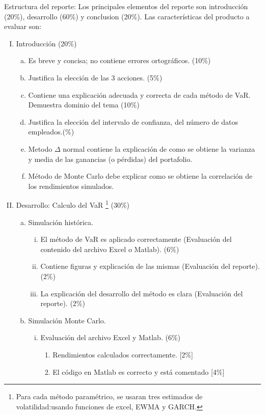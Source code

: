 \documentclass[12pt]{article}
\begin{document}
Estructura del reporte: Los principales elementos del reporte son introducci\'on (20\%), desarrollo (60\%) y conclusion (20\%).
Las caracter\'isticas del producto a evaluar son:
\begin{enumerate}[I.]
	\item Introducci\'on (20\%)
\begin{enumerate}[a)]
	\item Es breve y concisa; no contiene errores ortogr\'aficos. (10\%)
	\item Justifica la elecci\'on de las 3 acciones. (5\%)
	\item Contiene una explicaci\'on adecuada y correcta de cada m\'etodo de VaR. Demuestra dominio del tema (10\%)
	\item Justifica la elecci\'on del intervalo de confianza, del número de datos empleados.(\%)
    \item Metodo $\Delta$ normal contiene la explicaci\'on de como se obtiene la varianza y media de las ganancias (o p\'erdidas) del portafolio.
    \item M\'etodo de Monte Carlo debe explicar como se obtiene la correlaci\'on de los rendimientos simulados.
\end{enumerate}
	\item Desarrollo: Calculo del VaR \footnote{Para cada m\'etodo param\'etrico, se usaran tres estimados de volatilidad:usando funciones de excel, EWMA y GARCH.} (30\%)
\begin{enumerate}[a)]
	\item Simulaci\'on hist\'orica.
\begin{enumerate}[i)]
	\item El m\'etodo de VaR es aplicado correctamente (Evaluaci\'on del contenido del archivo Excel o Matlab). (6\%)
	\item Contiene figuras y explicaci\'on de las mismas (Evaluaci\'on del reporte). (2\%)
	\item La explicaci\'on del desarrollo del m\'etodo es clara (Evaluaci\'on del reporte). (2\%)
\end{enumerate}
	\item Simulaci\'on Monte Carlo.
\begin{enumerate}[i)]
	\item Evaluaci\'on del archivo Excel y Matlab. (6\%)
						\begin{enumerate}
							\item Rendimientos calculados correctamente. [2\%]
							\item El c\'odigo en Matlab es correcto y est\'a comentado [4\%]

\end{enumerate}
\end{enumerate}
\end{enumerate}
\end{enumerate}
\end{document}
